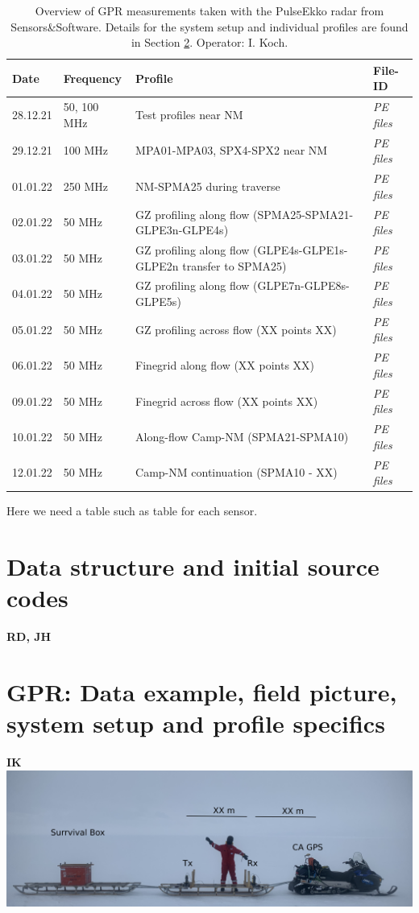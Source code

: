 \documentclass[a4paper,12pt]{article}
\begin{document}
\begin{table}
  \begin{tabular}{m{1.5cm} m{2.25cm} m{7cm} m{3cm}}
    \rowcolor{gray!50}
    Date & Frequency & Profile & File-ID\\
    \hline
    28.12.21 & 50, 100 MHz & Test profiles near NM& \textit{PE files}\\
    29.12.21 & 100 MHz & MPA01-MPA03, SPX4-SPX2 near NM& \textit{PE files}\\
    01.01.22 & 250 MHz  & NM-SPMA25 during traverse& \textit{PE files}\\
    02.01.22 & 50 MHz & GZ profiling along flow (SPMA25-SPMA21-GLPE3n-GLPE4s)& \textit{PE files}\\
    03.01.22 & 50 MHz & GZ profiling along flow (GLPE4s-GLPE1s-GLPE2n transfer to SPMA25)& \textit{PE files}\\
    04.01.22 & 50 MHz & GZ profiling along flow (GLPE7n-GLPE8s-GLPE5s)& \textit{PE files}\\
    05.01.22 & 50 MHz & GZ profiling across flow (XX points XX)& \textit{PE files}\\
    06.01.22 & 50 MHz & Finegrid along flow (XX points XX)& \textit{PE files}\\
    09.01.22 & 50 MHz & Finegrid across flow (XX points XX)& \textit{PE files}\\
    10.01.22 & 50 MHz & Along-flow Camp-NM (SPMA21-SPMA10)& \textit{PE files}\\
    12.01.22 & 50 MHz & Camp-NM continuation (SPMA10 - XX)& \textit{PE files}\\
    \hline
  \end{tabular}
  \caption{\label{TableGPR}Overview of GPR measurements taken with the PulseEkko radar from Sensors\&Software. Details for the system setup and individual profiles are found in Section \ref{SecGpr}. Operator: I. Koch.}
Here we need a table such as table \label{TableGPR} for each sensor. 
\end{table}

\pagebreak
\section{Data structure and initial source codes}
\textbf{RD, JH}

\pagebreak
\section{GPR: Data example, field picture, system setup and profile specifics}
\label{SecGpr}
\textbf{IK}
\includegraphics[width=\textwidth]{Figures/PulseEkko/RadarSetup.png}
\end{document}
